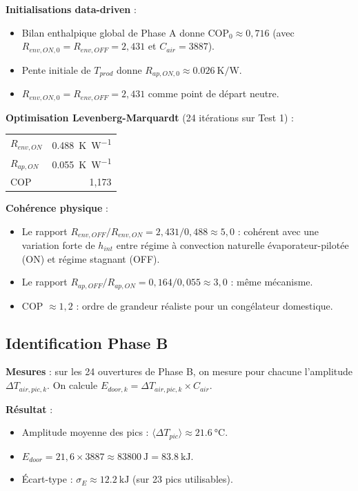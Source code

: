 \documentclass[11pt,a4paper]{article}
\begin{document}
\begin{exemple}
\textbf{Initialisations data-driven} :
\begin{itemize}[itemsep=2pt]
\item Bilan enthalpique global de Phase A donne $\mathrm{COP}_0 \approx 0{,}716$ (avec
$R_{env,ON,0} = R_{env,OFF} = 2{,}431$ et $C_{air} = 3887$).
\item Pente initiale de $T_{prod}$ donne $R_{ap,ON,0} \approx \SI{0,026}{\kelvin\per\watt}$.
\item $R_{env,ON,0} = R_{env,OFF} = 2{,}431$ comme point de départ neutre.
\end{itemize}

\textbf{Optimisation Levenberg-Marquardt} (24 itérations sur Test 1) :
\begin{center}
\begin{tabular}{lr}
$R_{env,ON}$ & \SI{0,488}{\kelvin\per\watt}\\
$R_{ap,ON}$ & \SI{0,055}{\kelvin\per\watt}\\
$\mathrm{COP}$ & 1{,}173\\
\end{tabular}
\end{center}

\textbf{Cohérence physique} :
\begin{itemize}[itemsep=0pt]
\item Le rapport $R_{env,OFF}/R_{env,ON} = 2{,}431/0{,}488 \approx 5{,}0$ : cohérent avec
une variation forte de $h_{int}$ entre régime à convection naturelle évaporateur-pilotée
(ON) et régime stagnant (OFF).
\item Le rapport $R_{ap,OFF}/R_{ap,ON} = 0{,}164/0{,}055 \approx 3{,}0$ : même mécanisme.
\item COP $\approx 1{,}2$ : ordre de grandeur réaliste pour un congélateur domestique.
\end{itemize}
\end{exemple}

\subsection{Identification Phase B}

\begin{exemple}
\textbf{Mesures} : sur les 24 ouvertures de Phase B, on mesure pour chacune l'amplitude
$\Delta T_{air,pic,k}$. On calcule $E_{door,k} = \Delta T_{air,pic,k} \times C_{air}$.

\textbf{Résultat} :
\begin{itemize}[itemsep=0pt]
\item Amplitude moyenne des pics : $\langle \Delta T_{pic} \rangle \approx \SI{21,6}{\celsius}$.
\item $E_{door} = 21{,}6 \times 3887 \approx \SI{83800}{\joule} = \SI{83,8}{\kilo\joule}$.
\item Écart-type : $\sigma_E \approx \SI{12,2}{\kilo\joule}$ (sur 23 pics utilisables).
\end{itemize}
\end{exemple}
\end{document}
